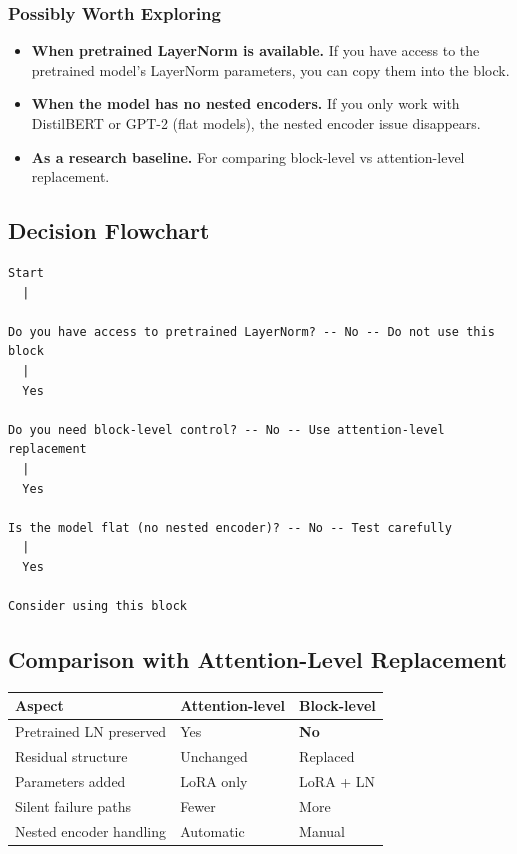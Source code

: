 \subsubsection{Possibly Worth Exploring}

\begin{itemize}
\item \textbf{When pretrained LayerNorm is available.} If you have access to the
  pretrained model's LayerNorm parameters, you can copy them into the block.
\item \textbf{When the model has no nested encoders.} If you only work with DistilBERT
  or GPT-2 (flat models), the nested encoder issue disappears.
\item \textbf{As a research baseline.} For comparing block-level vs attention-level
  replacement.

\end{itemize}
\subsection{Decision Flowchart}

\begin{lstlisting}
Start
  |
   
Do you have access to pretrained LayerNorm? -- No -- Do not use this block
  |
  Yes
   
Do you need block-level control? -- No -- Use attention-level replacement
  |
  Yes
   
Is the model flat (no nested encoder)? -- No -- Test carefully
  |
  Yes
   
Consider using this block
\end{lstlisting}

\subsection{Comparison with Attention-Level Replacement}

\begin{table}[H]
\centering
\small
\begin{tabular}{lll}
\toprule
\textbf{Aspect} & \textbf{Attention-level} & \textbf{Block-level} \\
\midrule
Pretrained LN preserved & Yes & \textbf{No} \\
Residual structure & Unchanged & Replaced \\
Parameters added & LoRA only & LoRA + LN \\
Silent failure paths & Fewer & More \\
Nested encoder handling & Automatic & Manual \\
\bottomrule
\end{tabular}
\end{table}

